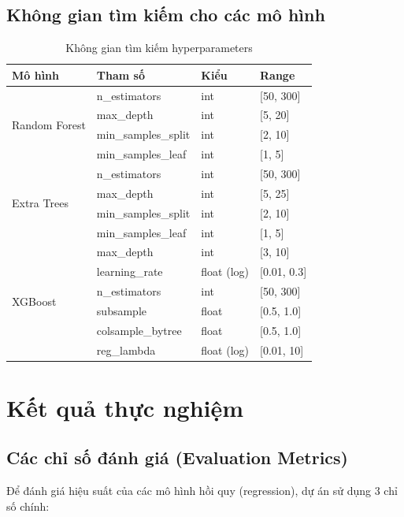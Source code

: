 \documentclass[12pt,a4paper]{article}
\begin{document}
\subsection{Không gian tìm kiếm cho các mô hình}

\begin{table}[H]
\centering
\caption{Không gian tìm kiếm hyperparameters}
\label{tab:search_space}
\begin{tabular}{|l|l|l|l|}
\hline
\textbf{Mô hình} & \textbf{Tham số} & \textbf{Kiểu} & \textbf{Range} \\
\hline
\multirow{4}{*}{Random Forest} & n\_estimators & int & [50, 300] \\
& max\_depth & int & [5, 20] \\
& min\_samples\_split & int & [2, 10] \\
& min\_samples\_leaf & int & [1, 5] \\
\hline
\multirow{4}{*}{Extra Trees} & n\_estimators & int & [50, 300] \\
& max\_depth & int & [5, 25] \\
& min\_samples\_split & int & [2, 10] \\
& min\_samples\_leaf & int & [1, 5] \\
\hline
\multirow{6}{*}{XGBoost} & max\_depth & int & [3, 10] \\
& learning\_rate & float (log) & [0.01, 0.3] \\
& n\_estimators & int & [50, 300] \\
& subsample & float & [0.5, 1.0] \\
& colsample\_bytree & float & [0.5, 1.0] \\
& reg\_lambda & float (log) & [0.01, 10] \\
\hline
\end{tabular}
\end{table}

\section{Kết quả thực nghiệm}

\subsection{Các chỉ số đánh giá (Evaluation Metrics)}

Để đánh giá hiệu suất của các mô hình hồi quy (regression), dự án sử dụng 3 chỉ số chính:
\end{document}
